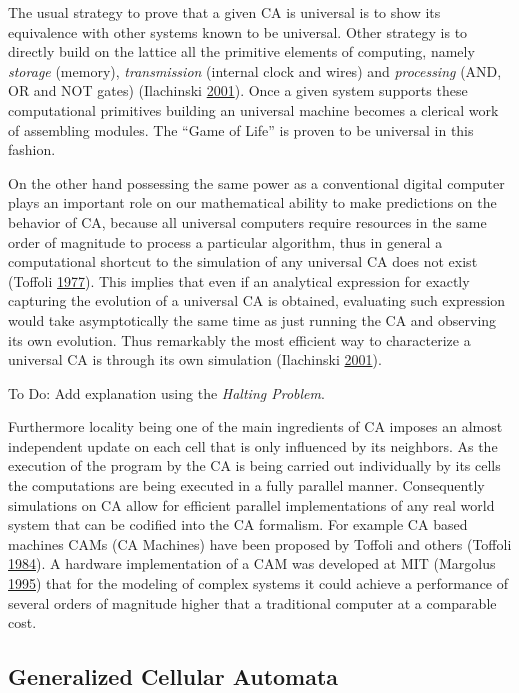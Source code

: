 \documentclass[
  openany]{book}
\begin{document}
The usual strategy to prove that a given CA is universal is to show its equivalence with other systems known to be universal. Other strategy is to directly build on the lattice all the primitive elements of computing, namely \emph{storage} (memory), \emph{transmission} (internal clock and wires) and \emph{processing} (AND, OR and NOT gates) (Ilachinski \protect\hyperlink{ref-ilachinski2001cellular}{2001}). Once a given system supports these computational primitives building an universal machine becomes a clerical work of assembling modules. The ``Game of Life'' is proven to be universal in this fashion.

On the other hand possessing the same power as a conventional digital computer plays an important role on our mathematical ability to make predictions on the behavior of CA, because all universal computers require resources in the same order of magnitude to process a particular algorithm, thus in general a computational shortcut to the simulation of any universal CA does not exist (Toffoli \protect\hyperlink{ref-toffoli1977cellular}{1977}). This implies that even if an analytical expression for exactly capturing the evolution of a universal CA is obtained, evaluating such expression would take asymptotically the same time as just running the CA and observing its own evolution. Thus remarkably the most efficient way to characterize a universal CA is through its own simulation (Ilachinski \protect\hyperlink{ref-ilachinski2001cellular}{2001}).

To Do: Add explanation using the \emph{Halting Problem}.

Furthermore locality being one of the main ingredients of CA imposes an almost independent update on each cell that is only influenced by its neighbors. As the execution of the program by the CA is being carried out individually by its cells the computations are being executed in a fully parallel manner. Consequently simulations on CA allow for efficient parallel implementations of any real world system that can be codified into the CA formalism. For example CA based machines CAMs (CA Machines) have been proposed by Toffoli and others (Toffoli \protect\hyperlink{ref-toffoli1984cam}{1984}). A hardware implementation of a CAM was developed at MIT (Margolus \protect\hyperlink{ref-margolus1995cam}{1995}) that for the modeling of complex systems it could achieve a performance of several orders of magnitude higher that a traditional computer at a comparable cost.

\hypertarget{generalized-cellular-automata}{%
\subsection{Generalized Cellular Automata}\label{generalized-cellular-automata}}
\end{document}
